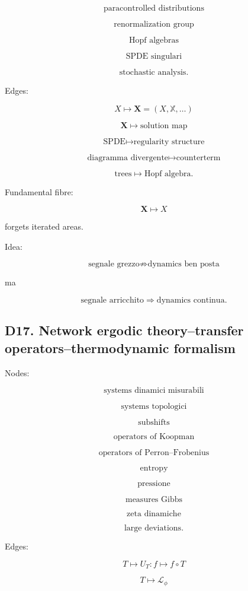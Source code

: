 \documentclass[11pt]{article}
\begin{document}
\[
\text{paracontrolled distributions}
\]

\[
\text{renormalization group}
\]

\[
\text{Hopf algebras}
\]

\[
\text{SPDE singulari}
\]

\[
\text{stochastic analysis}.
\]

Edges:

\[
X\mapsto \mathbf X=(X,\mathbb X,\ldots)
\]

\[
\mathbf X\mapsto \text{solution map}
\]

\[
\text{SPDE}\mapsto \text{regularity structure}
\]

\[
\text{diagramma divergente}\mapsto \text{counterterm}
\]

\[
\text{trees}\mapsto \text{Hopf algebra}.
\]

Fundamental fibre:

\[
\mathbf X\mapsto X
\]

forgets iterated areas.

Idea:

\[
\text{segnale grezzo}
\not\Rightarrow
\text{dynamics ben posta}
\]

ma

\[
\text{segnale arricchito}
\Rightarrow
\text{dynamics continua}.
\]



\subsection{D17. Network ergodic theory--transfer operators--thermodynamic formalism}

Nodes:

\[
\text{systems dinamici misurabili}
\]

\[
\text{systems topologici}
\]

\[
\text{subshifts}
\]

\[
\text{operators of Koopman}
\]

\[
\text{operators of Perron--Frobenius}
\]

\[
\text{entropy}
\]

\[
\text{pressione}
\]

\[
\text{measures Gibbs}
\]

\[
\text{zeta dinamiche}
\]

\[
\text{large deviations}.
\]

Edges:

\[
T\mapsto U_T:f\mapsto f\circ T
\]

\[
T\mapsto \mathcal L_\phi
\]
\end{document}
